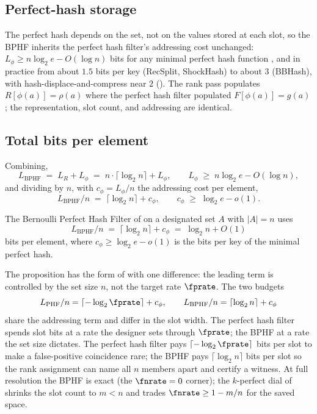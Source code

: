 \subsection*{Perfect-hash storage}

The perfect hash depends on the set, not on the values stored at each
slot, so the BPHF inherits the perfect hash filter's addressing cost
unchanged: $L_\phi \ge n \log_2 e - O(\log n)$ bits for any minimal
perfect hash function \parencite{fredman-komlos-1984}, and in practice
from about $1.5$ bits per key (RecSplit, ShockHash) to about $3$ (BBHash),
with hash-displace-and-compress near $2$ (). The
rank pass populates $R[\phi(a)] = \rho(a)$ where the perfect hash filter
populated $F[\phi(a)] = g(a)$; the representation, slot count, and
addressing are identical.

\subsection*{Total bits per element}

Combining,
\begin{equation}
\label{eq:bphf-total-bits}
  L_{\text{BPHF}}
  \;=\; L_R + L_\phi
  \;=\; n \cdot \lceil \log_2 n \rceil + L_\phi,
  \qquad L_\phi \;\ge\; n \log_2 e - O(\log n),
\end{equation}
and dividing by $n$, with $c_\phi = L_\phi / n$ the addressing cost per
element,
\begin{equation}
\label{eq:bphf-per-element}
  L_{\text{BPHF}} / n
  \;=\; \lceil \log_2 n \rceil + c_\phi,
  \qquad c_\phi \;\ge\; \log_2 e - o(1).
\end{equation}

\begin{proposition}
\label{prop:bphf-space}
The Bernoulli Perfect Hash Filter of  on a designated set
$A$ with $|A| = n$ uses
\[
  L_{\text{BPHF}} / n
  \;=\; \lceil \log_2 n \rceil + c_\phi
  \;=\; \log_2 n + O(1)
\]
bits per element, where $c_\phi \ge \log_2 e - o(1)$ is the bits per key
of the minimal perfect hash.
\end{proposition}

The proposition has the form of  with one
difference: the leading term is controlled by the set size $n$, not the
target rate $\fprate$. The two budgets
\[
  L_{\text{PHF}} / n = \lceil -\log_2 \fprate \rceil + c_\phi,
  \qquad
  L_{\text{BPHF}} / n = \lceil \log_2 n \rceil + c_\phi
\]
share the addressing term and differ in the slot width. The perfect hash
filter spends slot bits at a rate the designer sets through $\fprate$;
the BPHF at a rate the set size dictates. The perfect hash filter pays
$\lceil -\log_2 \fprate \rceil$ bits per slot to make a false-positive
coincidence rare; the BPHF pays $\lceil \log_2 n \rceil$ bits per slot so
the rank assignment can name all $n$ members apart and certify a witness.
At full resolution the BPHF is exact (the $\fnrate = 0$ corner); the
$k$-perfect dial of  shrinks the slot count
to $m < n$ and trades $\fnrate \ge 1 - m/n$ for the saved space.

